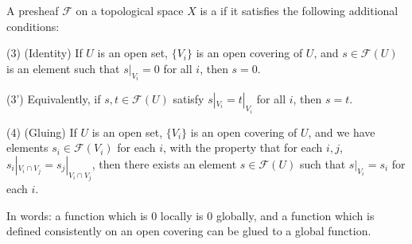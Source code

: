 A presheaf $\mathcal{F}$ on a topological space $X$ is a  if it satisfies the following additional conditions:

(3) (Identity) If $U$ is an open set, $\{V_i\}$ is an open covering of $U$, and $s \in \mathcal{F}(U)$ is an element such that $s|_{V_i} = 0$ for all $i$, then $s = 0$.

(3') Equivalently, if $s, t \in \mathcal{F}(U)$ satisfy $s|_{V_i} = t|_{V_i}$ for all $i$, then $s = t$.

(4) (Gluing) If $U$ is an open set, $\{V_i\}$ is an open covering of $U$, and we have elements $s_i \in \mathcal{F}(V_i)$ for each $i$, with the property that for each $i,j$, $s_i|_{V_i \cap V_j} = s_j|_{V_i \cap V_j}$, then there exists an element $s \in \mathcal{F}(U)$ such that $s|_{V_i} = s_i$ for each $i$.

In words: a function which is $0$ locally is $0$ globally, and a function which is defined consistently on an open covering can be glued to a global function.
